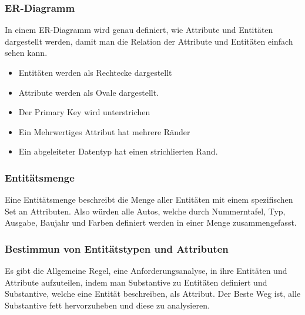 \documentclass{article}
\begin{document}
	\subsubsection{ER-Diagramm}
	In einem ER-Diagramm wird genau definiert, wie Attribute und Entitäten dargestellt werden, damit man die Relation der Attribute und Entitäten einfach sehen kann. \\
	\begin{itemize}
		\item{Entitäten werden als Rechtecke dargestellt}
		\item{Attribute werden als Ovale dargestellt.}
		\item{Der Primary Key wird unterstrichen}
		\item{Ein Mehrwertiges Attribut hat mehrere Ränder}
		\item{Ein abgeleiteter Datentyp hat einen strichlierten Rand.}
	\end{itemize}
	\subsubsection{Entitätsmenge}
	Eine Entitätsmenge beschreibt die Menge aller Entitäten mit einem spezifischen Set an Attributen. Also würden alle Autos, welche durch Nummerntafel, Typ, Ausgabe, Baujahr und Farben definiert werden in einer Menge zusammengefasst. \\
	\subsubsection{Bestimmun von Entitätstypen und Attributen}
	Es gibt die Allgemeine Regel, eine Anforderungsanalyse, in ihre Entitäten und Attribute aufzuteilen, indem man Substantive zu Entitäten definiert und Substantive, welche eine Entität beschreiben, als Attribut. Der Beste Weg ist, alle Substantive fett hervorzuheben und diese zu analysieren.
\end{document}

